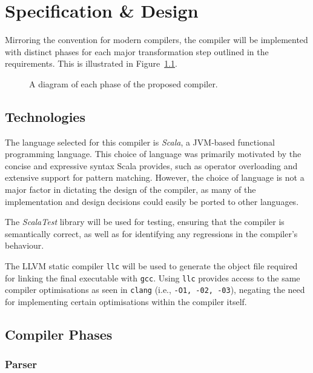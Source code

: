 \chapter{Specification \& Design}
\label{sec:design}

Mirroring the convention for modern compilers, the compiler will be implemented with distinct phases
for each major transformation step outlined in the requirements. This is illustrated in
Figure~\ref{fig:project-compiler-spec}.

\begin{figure}
      \centering
      
      \caption{A diagram of each phase of the proposed compiler.}
      \label{fig:project-compiler-spec}
\end{figure}

\section{Technologies}

The language selected for this compiler is \emph{Scala}, a JVM-based functional programming
language. This choice of language was primarily motivated by the concise and expressive syntax Scala
provides, such as operator overloading and extensive support for pattern matching. However, the
choice of language is not a major factor in dictating the design of the compiler, as many of the
implementation and design decisions could easily be ported to other languages.

The \emph{ScalaTest} library will be used for testing, ensuring that the compiler is semantically
correct, as well as for identifying any regressions in the compiler's behaviour.

The LLVM static compiler \texttt{llc} will be used to generate the object file required for linking
the final executable with \texttt{gcc}. Using \texttt{llc} provides access to the same compiler
optimisations as seen in \texttt{clang} (i.e., \texttt{-O1, -02, -03}), negating the need for
implementing certain optimisations within the compiler itself.

\section{Compiler Phases}

\subsection{Parser}

